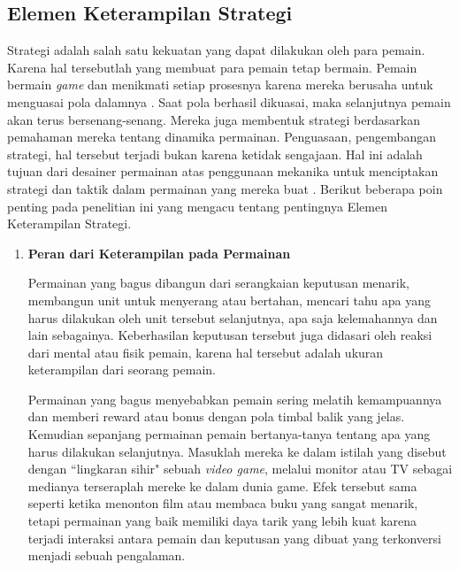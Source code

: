 \begin{subs}
\begin{enumerate}[label=\textbf{\alph*).}]
	\end{enumerate}
	
	\subsection{Elemen Keterampilan Strategi}
	\label{sec:sub_sec2_strategi}
	\vspace{1ex}
	
	Strategi adalah salah satu kekuatan yang dapat dilakukan oleh para pemain. Karena hal tersebutlah yang membuat para pemain tetap bermain. Pemain bermain \textit{game} dan menikmati setiap prosesnya karena mereka berusaha untuk menguasai pola dalamnya \citep{Koster2013}. Saat pola berhasil dikuasai, maka selanjutnya pemain akan terus bersenang-senang. Mereka juga membentuk strategi berdasarkan pemahaman mereka tentang dinamika permainan. Penguasaan, pengembangan strategi, hal tersebut terjadi bukan karena ketidak sengajaan. Hal ini adalah tujuan dari desainer permainan atas penggunaan mekanika untuk menciptakan strategi dan taktik dalam permainan yang mereka buat \cite{Brathwaite2009}. Berikut beberapa poin penting pada penelitian ini yang mengacu tentang pentingnya Elemen Keterampilan Strategi.
	\vspace{1ex}

	\begin{enumerate}[label=\textbf{\alph*).}]
		
		\item \textbf{Peran dari Keterampilan pada Permainan}
		\setlength{\parindent}{0.8cm}
	
		Permainan yang bagus dibangun dari serangkaian keputusan menarik, membangun unit untuk menyerang atau bertahan, mencari tahu apa yang harus dilakukan oleh unit tersebut selanjutnya, apa saja kelemahannya dan lain sebagainya. Keberhasilan keputusan tersebut juga didasari oleh reaksi dari mental atau fisik pemain, karena hal tersebut adalah ukuran keterampilan dari seorang pemain.
		\vspace{1ex}
	
		Permainan yang bagus menyebabkan pemain sering melatih kemampuannya dan memberi reward atau bonus dengan pola timbal balik yang jelas. Kemudian sepanjang permainan pemain bertanya-tanya tentang apa yang harus dilakukan selanjutnya. Masuklah mereka ke dalam istilah yang disebut dengan ``lingkaran sihir" sebuah \textit{video game}, melalui monitor atau TV sebagai medianya terseraplah mereke ke dalam dunia game. Efek tersebut sama seperti ketika menonton film atau membaca buku yang sangat menarik, tetapi permainan yang baik memiliki daya tarik yang lebih kuat karena terjadi interaksi antara pemain dan keputusan yang dibuat yang terkonversi menjadi sebuah pengalaman.
		\vspace{1ex}
		

\end{enumerate}
\end{subs}
